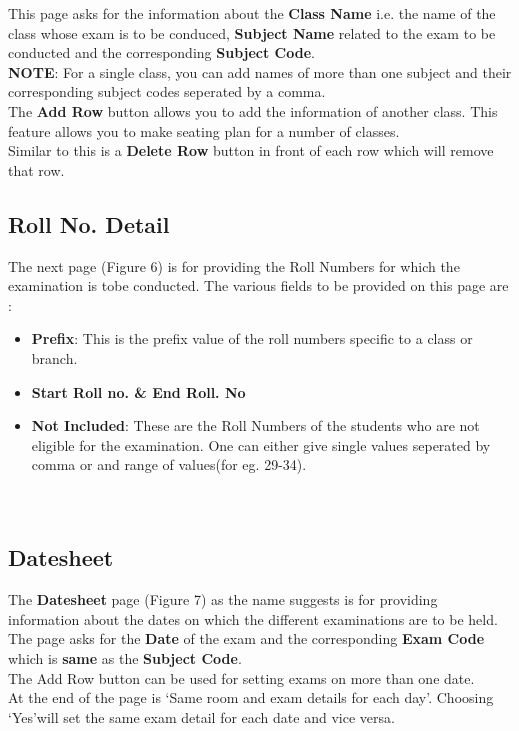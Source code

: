 This page asks for the information about the \textbf{Class Name} i.e. the name 
of the class whose exam is to be conduced, \textbf{Subject Name} related to the 
exam to be conducted and the corresponding \textbf{Subject Code}.\\

\textbf{NOTE}: For a single class, you can add names of more than one 
subject and their corresponding subject codes seperated by a comma.\\

The \textbf{Add Row} button allows you to add the information of another 
class. This feature allows you to make seating plan for a number of classes.\\
Similar to this is a \textbf{Delete Row} button in front of each row 
which will remove that row. 
\\

\subsection{Roll No. Detail}

The next page (Figure 6) is for providing the Roll Numbers for which 
the examination is tobe conducted.
The various fields to be provided on this page are :

\begin{itemize}
\item \textbf{Prefix}: This is the prefix value of the roll numbers 
specific to a class or branch.
\item \textbf{Start Roll no. \& End Roll. No}
\item \textbf{Not Included}: These are the Roll Numbers of the students
 who are not eligible for the examination. One can either give single values
 seperated by comma or and range of values(for eg. 29-34).\\\\\\
\end{itemize}

\subsection{Datesheet}


The \textbf{Datesheet} page (Figure 7) as the name suggests is for providing information
 about the dates on which the different examinations are to be held.\\
 The page asks for the \textbf{Date} of the exam and the corresponding
 \textbf{Exam Code} which is \textbf{same} as the \textbf{Subject Code}.\\
 The Add Row button can be used for setting exams on more than one date.\\
 At the end of the page is \lq Same room and exam details for each day\rq.
 Choosing \lq Yes\rq  will set the same exam detail for each date and 
 vice versa.
 
